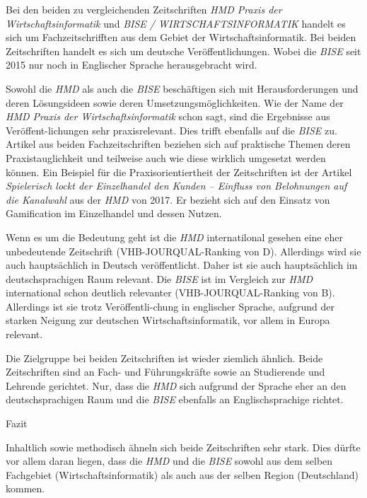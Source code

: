 \documentclass[12pt,utf8]{scrartcl}
\begin{document}
\begin{flushleft}
Bei den beiden zu vergleichenden Zeitschriften \emph{HMD Praxis der Wirtschaftsinformatik} und \emph{BISE / WIRTSCHAFTSINFORMATIK} handelt es sich um Fachzeitschrifften aus dem Gebiet der Wirtschaftsinformatik. Bei beiden Zeitschriften handelt es sich um deutsche Veröffentlichungen. Wobei die \emph{BISE} seit 2015 nur noch in Englischer Sprache herausgebracht wird\cite{BISE}.

Sowohl die \emph{HMD} als auch die \emph{BISE} beschäftigen sich mit Herausforderungen und deren Lösungsideen sowie deren Umsetzungsmöglichkeiten\cite{Meier2017}\cite{Stein2017}\cite{Ebert2017}. Wie der Name der \emph{HMD Praxis der Wirtschaftsinformatik} schon sagt, sind die Ergebnisse aus Veröffent-lichungen sehr praxisrelevant. Dies trifft ebenfalls auf die \emph{BISE} zu. Artikel aus beiden Fachzeitschriften beziehen sich auf praktische Themen deren Praxistauglichkeit und teilweise auch wie diese wirklich umgesetzt werden können\cite{Meier2017}\cite{Stein2017}\cite{Ebert2017}\cite{Kakar2017}. Ein Beispiel für die Praxisorientiertheit der Zeitschriften ist der Artikel \emph{Spielerisch lockt der Einzelhandel den Kunden – Einfluss von Belohnungen auf die Kanalwahl}\cite{Stein2017} aus der \emph{HMD} von 2017. Er bezieht sich auf den Einsatz von Gamification im Einzelhandel und dessen Nutzen. 

Wenn es um die Bedeutung geht ist die \emph{HMD} internatilonal gesehen eine eher unbedeutende Zeitschrift (VHB-JOURQUAL-Ranking von D)\cite{VHBJ}. Allerdings wird sie auch hauptsächlich in Deutsch veröffentlicht. Daher ist sie auch hauptsächlich im deutschsprachigen Raum relevant. 
Die \emph{BISE} ist im Vergleich zur \emph{HMD} international schon deutlich relevanter (VHB-JOURQUAL-Ranking von B)\cite{VHBJ}. Allerdings ist sie trotz Veröffentli-chung in englischer Sprache, aufgrund der starken Neigung zur deutschen Wirtschaftsinformatik, vor allem in Europa relevant. 

Die Zielgruppe bei beiden Zeitschriften ist wieder ziemlich ähnlich. Beide Zeitschriften sind an Fach- und Führungskräfte sowie an Studierende und Lehrende gerichtet. Nur, dass die \emph{HMD} sich aufgrund der Sprache eher an den deutschsprachigen Raum und die \emph{BISE} ebenfalls an Englischsprachige richtet.
\newline
\newline

{\Large Fazit}

Inhaltlich sowie methodisch ähneln sich beide Zeitschriften sehr stark. Dies dürfte vor allem daran liegen, dass die \emph{HMD} und die \emph{BISE} sowohl aus dem selben Fachgebiet (Wirtschaftsinformatik) als auch aus der selben Region (Deutschland) kommen.

\end{flushleft}
\end{document}
